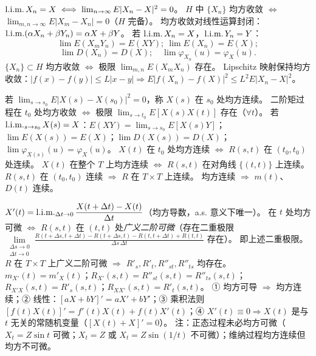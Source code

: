 \documentclass[UTF8,12pt,a4paper]{ctexart}
\begin{document}
 $\mathop{\mathrm{l.i.m.}} X_n=X\iff\lim_{n\to\infty}E|X_n-X|^2=0$。
 $H$ 中 $\{X_n\}$ 均方收敛 $\iff$ $\lim_{m,n\to\infty}E|X_m-X_n|=0$（$H$ 完备）。
 均方收敛对线性运算封闭：$\mathop{\mathrm{l.i.m.}}(\alpha X_n+\beta Y_n)=\alpha X+\beta Y$。
 若 $\mathop{\mathrm{l.i.m.}} X_n=X$，$\mathop{\mathrm{l.i.m.}} Y_n=Y$：
$$\lim E(X_mY_n)=E(XY);\ \lim E(X_n)=E(X);$$
$$\lim D(X_n)=D(X);\quad \lim\varphi_{X_n}(u)=\varphi_X(u).$$
 $\{X_n\}\subset H$ 均方收敛 $\iff$ 极限 $\lim_{m,n}E(X_mX_n)$ 存在。
 Lipschitz 映射保持均方收敛：$|f(x)-f(y)|\le L|x-y|\Rightarrow E|f(X_n)-f(X)|^2\le L^2E|X_n-X|^2$。

 若 $\lim_{s\to s_0}E|X(s)-X(s_0)|^2=0$，称 $X(s)$ 在 $s_0$ 处均方连续。
 二阶矩过程在 $t_0$ 处均方收敛 $\iff$ 极限 $\lim_{s\to t_0}E[X(s)X(t)]$ 存在（$\forall t$）。
 若 $\mathop{\mathrm{l.i.m.}}_{s\to s_0}X(s)=X$：$E(XY)=\lim_{s\to s_0}E[X(s)Y]$；$\lim E(X(s))=E(X)$；$\lim D(X(s))=D(X)$；$\lim\varphi_{X(s)}(u)=\varphi_X(u)$。
 $X(t)$ 在 $t_0$ 处均方连续 $\iff$ $R(s,t)$ 在 $(t_0,t_0)$ 处连续。
 $X(t)$ 在整个 $T$ 上均方连续 $\iff$ $R(s,t)$ 在对角线 $\{(t,t)\}$ 上连续。
 $R(s,t)$ 在 $(t_0,t_0)$ 连续 $\Rightarrow$ $R$ 在 $T\times T$ 上连续。
 均方连续 $\Rightarrow$ $m(t)$、$D(t)$ 连续。

 $X'(t)=\mathop{\mathrm{l.i.m.}}_{\Delta t\to0}\dfrac{X(t+\Delta t)-X(t)}{\Delta t}$（均方导数，a.s. 意义下唯一）。
 在 $t$ 处均方可微 $\iff$ $R(s,t)$ 在 $(t,t)$ 处\emph{广义二阶可微}（存在二重极限 $\lim\limits_{\substack{\Delta s\to0\\\Delta t\to0}}\frac{R(t+\Delta s,t+\Delta t)-R(t+\Delta s,t)-R(t,t+\Delta t)+R(t,t)}{\Delta s\,\Delta t}$ 存在）。
 即上述二重极限。
 $R$ 在 $T\times T$ 上广义二阶可微 $\Rightarrow$ $R'_s,R'_t,R''_{st},R''_{ts}$ 均存在。
 $m_{X'}(t)=m'_X(t)$；$R_{X'}(s,t)=R''_{st}(s,t)=R''_{ts}(s,t)$；$R_{X'X}(s,t)=R'_s(s,t)$；$R_{XX'}(s,t)=R'_t(s,t)$。
 ① 均方可导 $\Rightarrow$ 均方连续；② 线性：$[aX+bY]'=aX'+bY'$；③ 乘积法则 $[f(t)X(t)]'=f'(t)X(t)+f(t)X'(t)$；④ $X'(t)\equiv0\Rightarrow X(t)$ 是与 $t$ 无关的常随机变量（$[X(t)+X]'=0$）。
注：正态过程未必均方可微（$X_t=Z\sin t$ 可微；$X_t=Z$ 或 $X_t=Z\sin(1/t)$ 不可微）；维纳过程均方连续但均方不可微。
\end{document}
